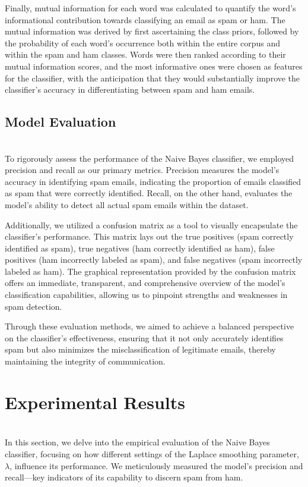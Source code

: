 \documentclass{acm_proc_article-sp}
\begin{document}
Finally, mutual information for each word was calculated to quantify the word's informational contribution towards classifying an email as spam or ham. The mutual information was derived by first ascertaining the class priors, followed by the probability of each word’s occurrence both within the entire corpus and within the spam and ham classes. Words were then ranked according to their mutual information scores, and the most informative ones were chosen as features for the classifier, with the anticipation that they would substantially improve the classifier's accuracy in differentiating between spam and ham emails.

\subsection{Model Evaluation}~\\
To rigorously assess the performance of the Naive Bayes classifier, we employed precision and recall as our primary metrics. Precision measures the model's accuracy in identifying spam emails, indicating the proportion of emails classified as spam that were correctly identified. Recall, on the other hand, evaluates the model’s ability to detect all actual spam emails within the dataset.

Additionally, we utilized a confusion matrix as a tool to visually encapsulate the classifier’s performance. This matrix lays out the true positives (spam correctly identified as spam), true negatives (ham correctly identified as ham), false positives (ham incorrectly labeled as spam), and false negatives (spam incorrectly labeled as ham). The graphical representation provided by the confusion matrix offers an immediate, transparent, and comprehensive overview of the model's classification capabilities, allowing us to pinpoint strengths and weaknesses in spam detection.

Through these evaluation methods, we aimed to achieve a balanced perspective on the classifier's effectiveness, ensuring that it not only accurately identifies spam but also minimizes the misclassification of legitimate emails, thereby maintaining the integrity of communication.

\section{Experimental Results}~\\
In this section, we delve into the empirical evaluation of the Naive Bayes classifier, focusing on how different settings of the Laplace smoothing parameter, \(\lambda\), influence its performance. We meticulously measured the model's precision and recall—key indicators of its capability to discern spam from ham.
\end{document}
